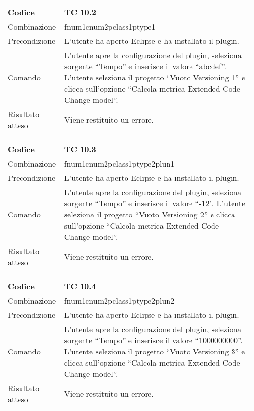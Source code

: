 \begin{table}[ht]
\begin{tabular}{|p{3cm}|p{9cm}|}
\hline
\cellcolor{lightgray}Codice				& TC 10.2								\\
\hline
\cellcolor{lightgray}Combinazione		& fnum1cnum2pclass1ptype1									\\
\hline
\cellcolor{lightgray}Precondizione		& L'utente ha aperto Eclipse e ha installato il plugin.		\\
\hline
\cellcolor{lightgray}Comando			& L'utente apre la configurazione del plugin, seleziona sorgente ``Tempo'' e inserisce il valore ``abcdef''. L'utente seleziona il progetto ``Vuoto Versioning 1''  e clicca sull'opzione ``Calcola metrica Extended Code Change model''.	\\
\hline
\cellcolor{lightgray}Risultato atteso	& Viene restituito un errore.\\
\hline
\end{tabular}
\end{table}


\begin{table}[ht]
\begin{tabular}{|p{3cm}|p{9cm}|}
\hline
\cellcolor{lightgray}Codice				& TC 10.3								\\
\hline
\cellcolor{lightgray}Combinazione		& fnum1cnum2pclass1ptype2plun1									\\
\hline
\cellcolor{lightgray}Precondizione		& L'utente ha aperto Eclipse e ha installato il plugin.		\\
\hline
\cellcolor{lightgray}Comando			& L'utente apre la configurazione del plugin, seleziona sorgente ``Tempo'' e inserisce il valore ``-12''. L'utente seleziona il progetto ``Vuoto Versioning 2''  e clicca sull'opzione ``Calcola metrica Extended Code Change model''.	\\
\hline
\cellcolor{lightgray}Risultato atteso	& Viene restituito un errore.\\
\hline
\end{tabular}
\end{table}


\begin{table}[ht]
\begin{tabular}{|p{3cm}|p{9cm}|}
\hline
\cellcolor{lightgray}Codice				& TC 10.4								\\
\hline
\cellcolor{lightgray}Combinazione		& fnum1cnum2pclass1ptype2plun2									\\
\hline
\cellcolor{lightgray}Precondizione		& L'utente ha aperto Eclipse e ha installato il plugin.		\\
\hline
\cellcolor{lightgray}Comando			& L'utente apre la configurazione del plugin, seleziona sorgente ``Tempo'' e inserisce il valore ``1000000000''. L'utente seleziona il progetto ``Vuoto Versioning 3''  e clicca sull'opzione ``Calcola metrica Extended Code Change model''.	\\
\hline
\cellcolor{lightgray}Risultato atteso	& Viene restituito un errore.\\
\hline
\end{tabular}
\end{table}


